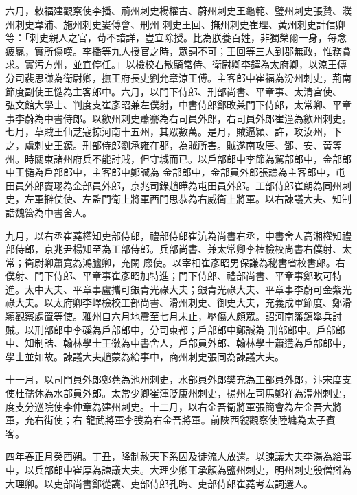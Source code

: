 \begin{pinyinscope}
 六月，敕福建觀察使李播、荊州刺史楊權古、蔚州刺史王龜範、璧州刺史張贄、濮州刺史韋浦、施州刺史婁傅會、刑州
 刺史王回、撫州刺史崔理、黃州刺史計信卿等：「刺史親人之官，茍不諳詳，豈宜除授。比為朕養百姓，非獨榮爾一身，每念疲羸，實所傷嘆。李播等九人授官之時，眾詞不可；王回等三人到郡無政，惟務貪求。實污方州，並宜停任。」以檢校右散騎常侍、衛尉卿李鐸為太府卿，以涼王傅分司裴思謙為衛尉卿，撫王府長史劉允章涼王傅。主客郎中崔福為汾州刺史，荊南節度副使王慥為主客郎中。六月，以門下侍郎、刑部尚書、平章事、太清宮使、
 弘文館大學士、判度支崔彥昭兼左僕射，中書侍郎鄭畋兼門下侍郎，太常卿、平章事李蔚為中書侍郎。以歙州刺史蕭騫為右司員外郎，右司員外郎崔潼為歙州刺史。七月，草賊王仙芝寇掠河南十五州，其眾數萬。是月，賊逼潁、許，攻汝州，下之，虜刺史王鐐。刑部侍郎劉承雍在郡，為賊所害。賊遂南攻唐、鄧、安、黃等州。時關東諸州府兵不能討賊，但守城而已。以戶部郎中李節為駕部郎中，金部郎中王慥為戶部郎中，主客郎中鄭諴為
 金部郎中，金部員外郎張譙為主客郎中，屯田員外郎竇珝為金部員外郎，京兆司錄趙曄為屯田員外郎。工部侍郎崔朗為同州刺史，左軍擗仗使、左監門衛上將軍西門思恭為右威衛上將軍。以右諫議大夫、知制誥魏簹為中書舍人。



 九月，以右丞崔蕘權知吏部侍郎，禮部侍郎崔沆為尚書右丞，中書舍人高湘權知禮部侍郎，京兆尹楊知至為工部侍郎。兵部尚書、兼太常卿李榼檢校尚書右僕射、太常；衛尉卿蕭寬為鴻臚卿，充閑
 廄使。以宰相崔彥昭男保謙為秘書省校書郎。右僕射、門下侍郎、平章事崔彥昭加特進；門下侍郎、禮部尚書、平章事鄭畋可特進。太中大夫、平章事盧攜可銀青光祿大夫；銀青光祿大夫、平章事李蔚可金紫光祿大夫。以太府卿李嶧檢校工部尚書、滑州刺史、御史大夫，充義成軍節度、鄭滑潁觀察處置等使。雅州自六月地震至七月未止，壓傷人頗眾。詔河南籓鎮舉兵討賊。以刑部郎中李磎為戶部郎中，分司東都；戶部郎中鄭諴為
 刑部郎中。戶部郎中、知制誥、翰林學士王徽為中書舍人，戶部員外郎、翰林學士蕭遘為戶部郎中，學士並如故。諫議大夫趙蒙為給事中，商州刺史張同為諫議大夫。



 十一月，以司門員外郎鄭蕘為池州刺史，水部員外郎樊充為工部員外郎，汴宋度支使杜孺休為水部員外郎。太常少卿崔渾貶康州刺史，揚州左司馬鄭祥為澧州刺史，度支分巡院使李仲章為建州刺史。十二月，以右金吾衛將軍張簡會為左金吾大將軍，充右街使；右
 龍武將軍李弢為右金吾將軍。前陜西虢觀察使陸墉為太子賓客。



 四年春正月癸酉朔。丁丑，降制赦天下系囚及徒流人放還。以諫議大夫李湯為給事中，以兵部郎中崔厚為諫議大夫。大理少卿王承顏為鹽州刺史，明州刺史殷僧辯為大理卿。以吏部尚書鄭從讜、吏部侍郎孔晦、吏部侍郎崔蕘考宏詞選人。




\end{pinyinscope}
